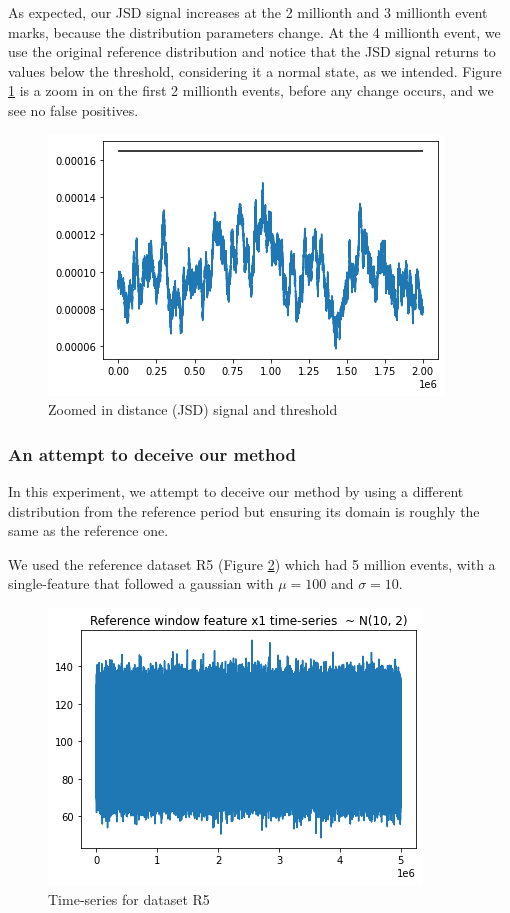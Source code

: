 As expected, our JSD signal increases at the 2 millionth and 3 millionth event marks, because the distribution parameters change. At the 4 millionth event, we use the original reference distribution and notice that the JSD signal returns to values below the threshold, considering it a normal state, as we intended. Figure \ref{fig:JSD-signal-zoom-test04} is a zoom in on the first 2 millionth events, before any change occurs, and we see no false positives.
\begin{figure}[!htb]
    \begin{center}
      \includegraphics[scale=0.6]{figures/stream-analysis-viz-zoom-test04.png}
      \caption[]{Zoomed in distance (JSD) signal and threshold}
      \label{fig:JSD-signal-zoom-test04}
    \end{center}
\end{figure}

\subsubsection{An attempt to deceive our method}
In this experiment, we attempt to deceive our method by using a different distribution from the reference period but ensuring its domain is roughly the same as the reference one.

We used the reference dataset R5 (Figure \ref{fig:timeseries-r5}) which had 5 million events, with a single-feature that followed a gaussian with  $\mu=100$ and $\sigma=10$.
\begin{figure}[!htb]
    \begin{center}
      \includegraphics[scale=0.6]{figures/timeseries-r5.png}
      \caption[]{Time-series for dataset R5}
      \label{fig:timeseries-r5}
    \end{center}
\end{figure}

